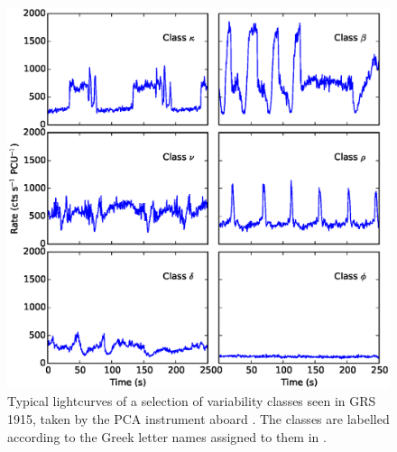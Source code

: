 \begin{figure}
  \centering
  \includegraphics[width=\linewidth, trim= 0mm 0mm 0mm 0mm, clip]{images/GRSsample.eps}
  \caption[Typical lightcurves of a selection of variability classes seen in the LMXB GRS 1915+105.]{\indexkappa\indexnu\indexbeta\indexrho\indexdelta\indexphi Typical lightcurves of a selection of variability classes seen in GRS 1915, taken by the PCA instrument aboard \rxte\indexrxte\indexpca.  The classes are labelled according to the Greek letter names assigned to them in \citet{Belloni_GRS_MI}.}
  \label{fig:GRSsample}
\end{figure}

